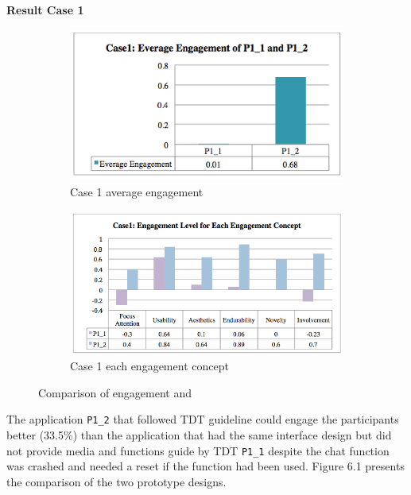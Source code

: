 \textbf{Result Case 1} 
\begin{figure}[!hbt]\centering
    \begin{subfigure}{0.7\textwidth}
 \includegraphics[width=\textwidth]{case1a}
 \caption{Case 1 average engagement}
    \end{subfigure}\hspace{0.1\textwidth}
    \begin{subfigure}{1.0\textwidth}
\includegraphics[width=\textwidth]{case1b}
  \caption{Case 1 each engagement concept}
    \end{subfigure}
    \caption{Comparison of engagement   and }
\end{figure}

The application \verb|P1_2| that followed TDT guideline could engage the participants better (33.5\%) than the application that had the same interface design but did not provide media and functions guide by TDT \verb|P1_1| despite the chat function was crashed and needed a reset if the function had been used. Figure 6.1 presents the comparison of the two prototype designs. 
 

